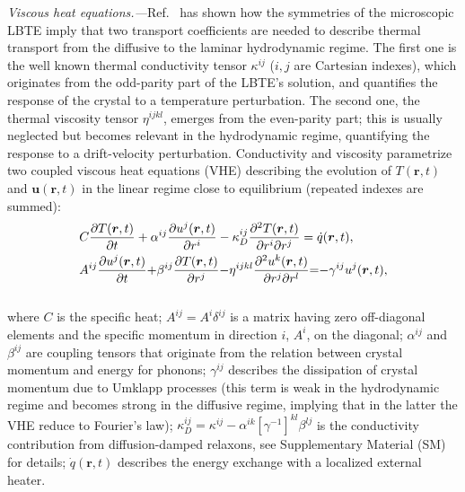 \documentclass[
prb,
twocolumn,
superscriptaddress,
 amsmath,amssymb,
 aps,
longbibliography,
]{revtex4-2}
\begin{document}
\textit{Viscous heat equations.---}Ref.~\cite{Simoncelli2020} has shown how the symmetries of the microscopic LBTE imply that two transport coefficients
are needed to describe thermal transport from the diffusive to the laminar hydrodynamic regime. The first one is the well known thermal conductivity tensor $\kappa^{ij}$ ($i,j$ are Cartesian indexes), which originates from the odd-parity part of the LBTE's solution, and quantifies the response of the crystal to a temperature perturbation.
The second one, the thermal viscosity tensor $\eta^{ijkl}$, emerges from the even-parity part; this is usually neglected but becomes relevant in the hydrodynamic regime, quantifying the response to a drift-velocity perturbation.
Conductivity and viscosity parametrize two coupled viscous heat equations (VHE) describing the evolution of $T({\bm r}, t)$ and $\bm{u}({\bm r}, t)$ in the linear regime close to equilibrium (repeated indexes are summed):
\begin{align}
&C\frac{\partial T({\bm r}, t)}{\partial t} +\alpha^{ij}\frac{\partial u^j({\bm r}, t)}{\partial r^i} - \kappa^{ij}_D \frac{\partial^2 T ({\bm r}, t)}{\partial r^i \partial r^j} = \dot{q}({\bm r}, t),
 \label{viscous_heat_T}\\
&{A}^{ij}\frac{\partial u^{j}({\bm r}, t)}{\partial t} {+}
\beta^{ij}
\frac{\partial T({\bm r}, t)}{\partial r^j} {-} \eta^{ijkl} \frac{\partial^2 u^k({\bm r}, t)}{\partial r^j \partial r^l} {=} {-} \gamma^{ij} u^j({\bm r}, t),\label{viscous_heat_U}
\raisetag{1mm}
\end{align}\\[-5mm]
where $C$ is the specific heat; $A^{ij}{=}A^{i}\delta^{ij}$ is a matrix having zero off-diagonal elements and the specific momentum in direction $i$, $A^{i}$, on the diagonal;
$\alpha^{ij}$ and $\beta^{ij}$ are coupling tensors that originate from the relation between crystal momentum and energy for phonons;
$\gamma^{ij}$ describes the dissipation of crystal momentum due to Umklapp processes (this term is weak in the hydrodynamic regime and becomes strong in the diffusive regime, implying that in the latter the VHE reduce to Fourier's law);
$\kappa^{ij}_D=\kappa^{ij}{-}\alpha^{ik}[\gamma^{-1}]^{kl}\beta^{lj}$ is the conductivity contribution from diffusion-damped relaxons, see Supplementary Material (SM) for details;
$\dot{q}({\bm r}, t)$ describes the energy exchange with a localized external heater.
\end{document}
